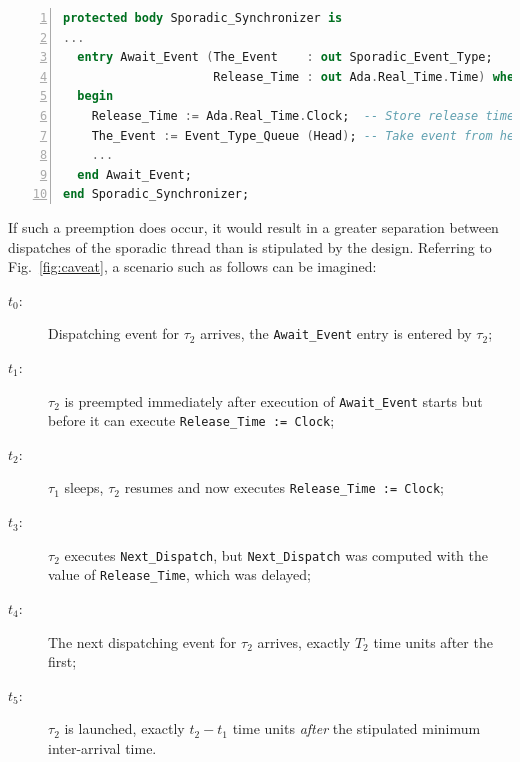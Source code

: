 \begin{lstlisting}[label=lst:caveat,language=ada,numbers=left,caption=Semantic caveat
    in sporadic task release due to non-atomic release and time calculation.]
protected body Sporadic_Synchronizer is
...
  entry Await_Event (The_Event    : out Sporadic_Event_Type; 
                     Release_Time : out Ada.Real_Time.Time) when Event_Present is
  begin
    Release_Time := Ada.Real_Time.Clock;  -- Store release time --
    The_Event := Event_Type_Queue (Head); -- Take event from head of event queue --
    ...
  end Await_Event;
end Sporadic_Synchronizer;
\end{lstlisting}

If such a preemption does occur, it would result in a greater
separation between dispatches of the sporadic thread than is
stipulated by the design. Referring to Fig.~\ref{fig:caveat}, a
scenario such as follows can be imagined:

\begin{description}
\item[$t_0$:]{Dispatching event for $\tau_2$ arrives, the
  \texttt{Await\_Event} entry is entered by $\tau_2$;}
\item[$t_1$:]{$\tau_2$ is preempted immediately after execution of
  \texttt{Await\_Event} starts but before it can execute
  \texttt{Release\_Time := Clock};}
\item[$t_2$:]{$\tau_1$ sleeps, $\tau_2$ resumes and now executes
  \texttt{Release\_Time := Clock};}
\item[$t_3$:]{$\tau_2$ executes \texttt{Next\_Dispatch}, but \texttt{Next\_Dispatch} was computed
  with the value of \texttt{Release\_Time}, which was delayed;}
\item[$t_4$:]{The next dispatching event for $\tau_2$ arrives, exactly
  $T_2$ time units after the first;}
\item[$t_5$:]{$\tau_2$ is launched, exactly $t_2 - t_1$ time units
  \emph{after} the stipulated minimum inter-arrival time.}
\end{description}

